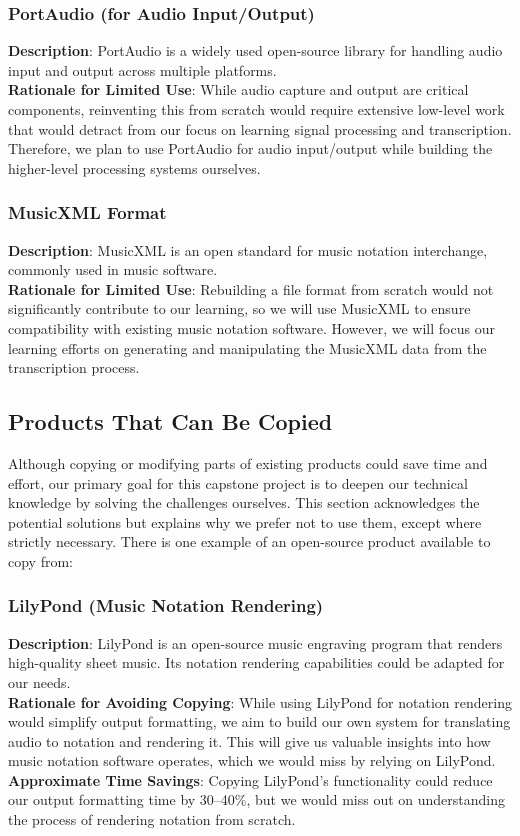 \documentclass[12pt]{article}
\begin{document}
\subsubsection*{PortAudio (for Audio Input/Output)~\cite{portaudio}}
\textbf{Description}: PortAudio is a widely used open-source library for handling audio input and output across multiple platforms.\\
\textbf{Rationale for Limited Use}: While audio capture and output are critical components, reinventing this from scratch would require extensive low-level work that would detract from our focus on learning signal processing and transcription. Therefore, we plan to use PortAudio for audio input/output while building the higher-level processing systems ourselves.\\

\subsubsection*{MusicXML Format~\cite{musicxml}}
\textbf{Description}: MusicXML is an open standard for music notation interchange, commonly used in music software.\\
\textbf{Rationale for Limited Use}: Rebuilding a file format from scratch would not significantly contribute to our learning, so we will use MusicXML to ensure compatibility with existing music notation software. However, we will focus our learning efforts on generating and manipulating the MusicXML data from the transcription process.\\

\subsection{Products That Can Be Copied}
Although copying or modifying parts of existing products could save time and effort, our primary goal for this capstone project is to deepen our technical knowledge by solving the challenges ourselves. This section acknowledges the potential solutions but explains why we prefer not to use them, except where strictly necessary. There is one example of an open-source product available to copy from:\\

\subsubsection*{LilyPond (Music Notation Rendering)~\cite{lilypond}}
\textbf{Description}: LilyPond is an open-source music engraving program that renders high-quality sheet music. Its notation rendering capabilities could be adapted for our needs.\\
\textbf{Rationale for Avoiding Copying}: While using LilyPond for notation rendering would simplify output formatting, we aim to build our own system for translating audio to notation and rendering it. This will give us valuable insights into how music notation software operates, which we would miss by relying on LilyPond.\\
\textbf{Approximate Time Savings}: Copying LilyPond’s functionality could reduce our output formatting time by 30–40\%, but we would miss out on understanding the process of rendering notation from scratch.
\end{document}
